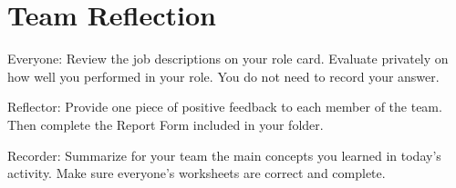
\section*{Team Reflection}

Everyone: Review the job descriptions on your role card.
Evaluate privately on how well you performed in your role.
You do not need to record your answer.

\vspace{1em}

Reflector: Provide one piece of positive feedback to each member of the team.
Then complete the Report Form included in your folder.

\vspace{1em}

Recorder: Summarize for your team the main concepts you learned in today's activity.
Make sure everyone's worksheets are correct and complete.
